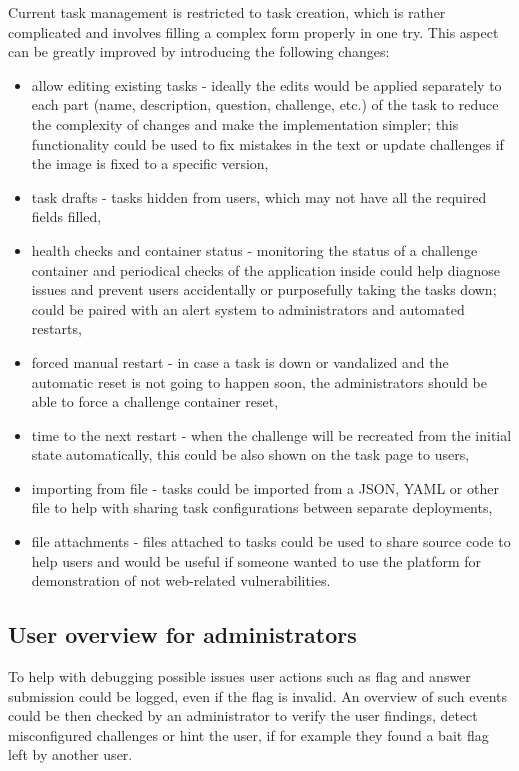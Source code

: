 Current task management is restricted to task creation, which is rather complicated and involves filling a complex form properly in one try. This aspect can be greatly improved by introducing the following changes:
\begin{itemize}
	\item allow editing existing tasks - ideally the edits would be applied separately to each part (name, description, question, challenge, etc.) of the task to reduce the complexity of changes and make the implementation simpler; this functionality could be used to fix mistakes in the text or update challenges if the image is fixed to a specific version,
	\item task drafts - tasks hidden from users, which may not have all the required fields filled,
	\item health checks and container status - monitoring the status of a challenge container and periodical checks of the application inside could help diagnose issues and prevent users accidentally or purposefully taking the tasks down; could be paired with an alert system to administrators and automated restarts,
	\item forced manual restart - in case a task is down or vandalized and the automatic reset is not going to happen soon, the administrators should be able to force a challenge container reset,
	\item time to the next restart - when the challenge will be recreated from the initial state automatically, this could be also shown on the task page to users,
	\item importing from file - tasks could be imported from a JSON, YAML or other file to help with sharing task configurations between separate deployments,
	\item file attachments - files attached to tasks could be used to share source code to help users and would be useful if someone wanted to use the platform for demonstration of not web-related vulnerabilities.
\end{itemize}

\subsection{User overview for administrators}

To help with debugging possible issues user actions such as flag and answer submission could be logged, even if the flag is invalid. An overview of such events could be then checked by an administrator to verify the user findings, detect misconfigured challenges or hint the user, if for example they found a bait flag left by another user.

